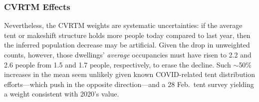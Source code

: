\documentclass[11pt,twocolumn]{article}
\def\bfr{\bf\color{red}}
\def\resp{respectively}
\begin{document}
%
%
%




\subsubsection{CVRTM Effects}
\label{sec:CVRTM}



Nevertheless, the CVRTM weights are systematic uncertainties: if the average tent or makeshift structure holds
more people today compared to last year, then the inferred population decrease may be artificial. Given the drop in 
unweighted counts, however, those dwellings' {\it average} occupancies must have risen to 2.2 and 2.6 people 
from 1.5 and 1.7 people, \resp, to erase the decline. Such $\sim$50\% increases in the mean seem unlikely given 
known COVID-related tent distribution efforts---which push in the opposite direction---and a 28 Feb.\ tent 
survey yielding a weight consistent with 2020's value. 
\end{document}
